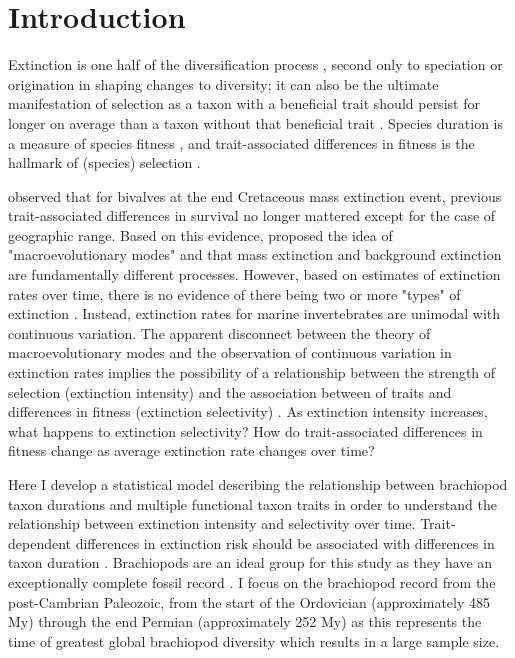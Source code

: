 \documentclass[11pt]{article}
\begin{document}
\section*{Introduction}

Extinction is one half of the diversification process \citep{Raup1994,Stanley1979,Stanley1975}, second only to speciation or origination in shaping changes to diversity; it can also be the ultimate manifestation of selection as a taxon with a beneficial trait should persist for longer on average than a taxon without that beneficial trait \citep{Jablonski2008a,Rabosky2010b,Raup1994,Stanley1975}. Species duration is a measure of species fitness \citep{Cooper1984}, and trait-associated differences in fitness is the hallmark of (species) selection \citep{Rabosky2010b}.

\citet{Jablonski1986} observed that for bivalves at the end Cretaceous mass extinction event, previous trait-associated differences in survival no longer mattered except for the case of geographic range. Based on this evidence, \citet{Jablonski1986} proposed the idea of "macroevolutionary modes" and that mass extinction and background extinction are fundamentally different processes. However, based on estimates of extinction rates over time, there is no evidence of there being two or more "types" of extinction \citep{Wang2003}. Instead, extinction rates for marine invertebrates are unimodal with continuous variation. The apparent disconnect between the theory of macroevolutionary modes and the observation of continuous variation in extinction rates implies the possibility of a relationship between the strength of selection (extinction intensity) and the association between of traits and differences in fitness (extinction selectivity) \citep{Payne2016}. As extinction intensity increases, what happens to extinction selectivity? How do trait-associated differences in fitness change as average extinction rate changes over time?

Here I develop a statistical model describing the relationship between brachiopod taxon durations and multiple functional taxon traits in order to understand the relationship between extinction intensity and selectivity over time. Trait-dependent differences in extinction risk should be associated with differences in taxon duration \citep{Cooper1984,Rabosky2010b}. Brachiopods are an ideal group for this study as they have an exceptionally complete fossil record \citep{Foote1996e,Foote2000a}. I focus on the brachiopod record from the post-Cambrian Paleozoic, from the start of the Ordovician (approximately 485 My) through the end Permian (approximately 252 My) as this represents the time of greatest global brachiopod diversity \citep{Alroy2010} which results in a large sample size.
\end{document}
